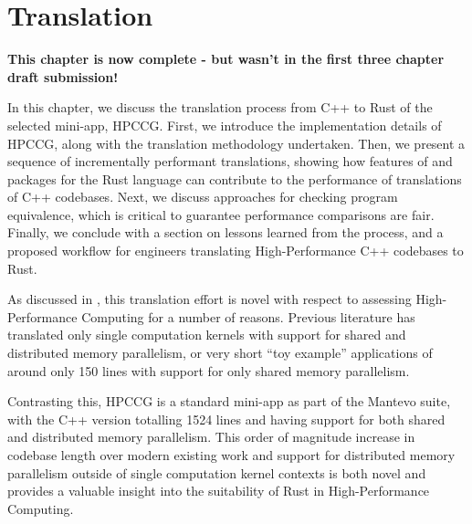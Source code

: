\chapter{Translation}
\label{ch:translation}

\textbf{This chapter is now complete - but wasn't in the first three chapter draft submission!}

In this chapter, we discuss the translation process from C++ to Rust of the selected mini-app, HPCCG. First, we introduce the implementation details of HPCCG, along with the translation methodology undertaken. Then, we present a sequence of incrementally performant translations, showing how features of and packages for the Rust language can contribute to the performance of translations of C++ codebases. Next, we discuss approaches for checking program equivalence, which is critical to guarantee performance comparisons are fair. Finally, we conclude with a section on lessons learned from the process, and a proposed workflow for engineers translating High-Performance C++ codebases to Rust.


As discussed in , this translation effort is novel with respect to assessing High-Performance Computing for a number of reasons. Previous literature has translated only single computation kernels \cite{bychkovRustLanguageSupercomputing2021} with support for shared and distributed memory parallelism, or very short ``toy example'' applications of around only 150 lines \cite{costanzoPerformanceVsProgramming2021} \cite{moranEmergingTechnologiesRust2023} with support for only shared memory parallelism.

Contrasting this, HPCCG is a standard mini-app as part of the Mantevo suite, with the C++ version totalling 1524 lines and having support for both shared and distributed memory parallelism. This order of magnitude increase in codebase length over modern existing work and support for distributed memory parallelism outside of single computation kernel contexts is both novel and provides a valuable insight into the suitability of Rust in High-Performance Computing.

